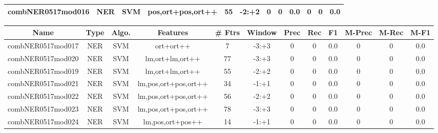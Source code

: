 \documentclass[a4paper]{article}
\begin{document}
\begin{landscape}
\begin{center}
\begin{tabular}{ |c|c|c|c|c|c|c|c|c|c|c|c|}
 
 	
 	\small{ combNER0517mod016 } & \small{ NER} & \small{  SVM }  & pos,ort+pos,ort++  &  55 &  \small{  -2:+2 }  &  0 & 0 & 0.0  &  0 & 0 & 0.0 \\
 	
 \hline
\end{tabular}
\end{center}




\begin{center}
\begin{tabular}{ |c|c|c|c|c|c|c|c|c|c|c|c|} 
 \hline
 	Name & Type & Algo. & Features & \# Ftrs & Window & Prec & Rec & F1 & M-Prec & M-Rec & M-F1\\
 \hline

 	

 
 	
 	\small{ combNER0517mod017 } & \small{ NER} & \small{  SVM }  & ort+ort++  &  7 &  \small{  -3:+3 }  &  0 & 0 & 0.0  &  0 & 0 & 0.0 \\
 	

 
 	
 	\small{ combNER0517mod020 } & \small{ NER} & \small{  SVM }  & lm,ort+lm,ort++  &  77 &  \small{  -3:+3 }  &  0 & 0 & 0.0  &  0 & 0 & 0.0 \\
 	

 
 	
 	\small{ combNER0517mod019 } & \small{ NER} & \small{  SVM }  & lm,ort+lm,ort++  &  55 &  \small{  -2:+2 }  &  0 & 0 & 0.0  &  0 & 0 & 0.0 \\
 	

 
 	
 	\small{ combNER0517mod021 } & \small{ NER} & \small{  SVM }  & lm,pos,ort+pos,ort++  &  34 &  \small{  -1:+1 }  &  0 & 0 & 0.0  &  0 & 0 & 0.0 \\
 	

 
 	
 	\small{ combNER0517mod022 } & \small{ NER} & \small{  SVM }  & lm,pos,ort+pos,ort++  &  56 &  \small{  -2:+2 }  &  0 & 0 & 0.0  &  0 & 0 & 0.0 \\
 	

 
 	
 	\small{ combNER0517mod023 } & \small{ NER} & \small{  SVM }  & lm,pos,ort+pos,ort++  &  78 &  \small{  -3:+3 }  &  0 & 0 & 0.0  &  0 & 0 & 0.0 \\
 	

 
 	
 	\small{ combNER0517mod024 } & \small{ NER} & \small{  SVM }  & lm,pos,ort+pos++  &  14 &  \small{  -1:+1 }  &  0 & 0 & 0.0  &  0 & 0 & 0.0 \\
 	


\end{tabular}
\end{center}
\end{landscape}
\end{document}
